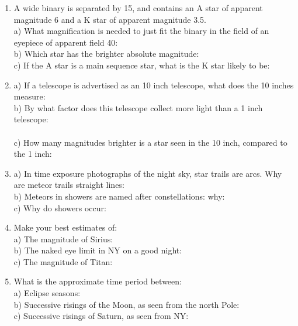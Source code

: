 \documentclass[11pt]{article}
\begin{document}
\begin{enumerate}
\vspace{0.5cm}
\item
A wide binary is separated by 15\arcmin, and contains an A
star of apparent magnitude 6 and a K star of apparent magnitude
3.5.\\
a) What magnification is needed to just fit the binary in the field of
an eyepiece of apparent field 40\deg: \makebox[6cm]{\hrulefill} \\
b) Which star has the brighter absolute magnitude:
\makebox[6cm]{\hrulefill} \\ 
c) If the A star is a main sequence star, what is the K star likely to
be:  \makebox[3cm]{\hrulefill} 



\vspace{0.5cm}
\item
a) If a telescope is advertised as an 10 inch telescope, what does the 10
inches measure:  \makebox[3cm]{\hrulefill} \\
b) By what factor does this telescope collect more light than a 1 inch
telescope:  \\ \makebox[3cm]{\hrulefill} \\
c) How many magnitudes brighter is a star seen in the 10 inch,
compared to the 1 inch: \makebox[3cm]{\hrulefill}


\vspace{0.5cm}
\item
a) In time exposure photographs of the night sky, star trails are arcs.
Why are meteor trails  straight lines:
\makebox[6cm]{\hrulefill} \\
b) Meteors in showers are named after constellations: why:
\makebox[3cm]{\hrulefill} \\
c) Why do showers occur: \makebox[3cm]{\hrulefill} 


\vspace{0.5cm}
\item
Make your best estimates of: \\
a) The magnitude of Sirius: \makebox[3cm]{\hrulefill} \\
b) The naked eye limit in NY on a good night: \makebox[3cm]{\hrulefill} \\
c) The magnitude of Titan: \makebox[3cm]{\hrulefill}


\vspace{0.5cm}
\item
What is the approximate time period between:\\
a) Eclipse seasons: \makebox[5cm]{\hrulefill}  \\
b) Successive risings of the Moon, as seen from the north Pole:
\makebox[5cm]{\hrulefill}  \\
c) Successive risings of Saturn, as seen from NY: \makebox[5cm]{\hrulefill} 


\end{enumerate}
\end{document}
